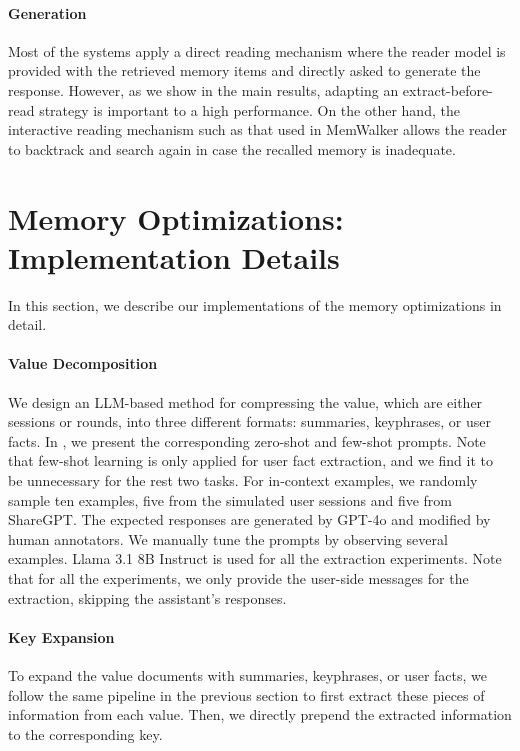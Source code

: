 \paragraph{Generation} Most of the systems apply a direct reading mechanism where the reader model is provided with the retrieved memory items and directly asked to generate the response. However, as we show in the main results, adapting an extract-before-read strategy is important to a high performance. On the other hand, the interactive reading mechanism such as that used in MemWalker allows the reader to backtrack and search again in case the recalled memory is inadequate. 


\section{Memory Optimizations: Implementation Details}
\label{appendix-memory-implementation}

In this section, we describe our implementations of the memory optimizations in detail.

\paragraph{Value Decomposition} We design an LLM-based method for compressing the value, which are either sessions or rounds, into three different formats: summaries, keyphrases, or user facts. In , we present the corresponding zero-shot and few-shot prompts. Note that few-shot learning is only applied for user fact extraction, and we find it to be unnecessary for the rest two tasks. For in-context examples, we randomly sample ten examples, five from the simulated user sessions and five from ShareGPT. The expected responses are generated by GPT-4o and modified by human annotators. We manually tune the prompts by observing several examples. Llama 3.1 8B Instruct is used for all the extraction experiments. Note that for all the experiments, we only provide the user-side messages for the extraction, skipping the assistant's responses.

\paragraph{Key Expansion} To expand the value documents with summaries, keyphrases, or user facts, we follow the same pipeline in the previous section to first extract these pieces of information from each value. Then, we directly prepend the extracted information to the corresponding key.


